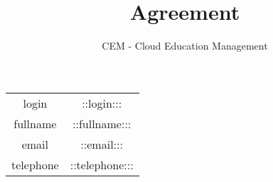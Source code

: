 \documentclass{article}
\title{Agreement}
\author{CEM - Cloud Education Management}
\begin{document}
\maketitle

\begin{center}

\begin{tabular}{ |c|c| }
login     & ::login:::\\
fullname    & ::fullname:::\\
email     & ::email:::\\
telephone    & ::telephone:::\\
\end{tabular}
\end{center}
\end{document}

